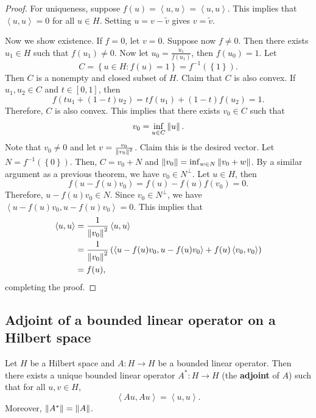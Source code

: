 \documentclass[a4paper]{article}
\renewcommand{\braket}[2]{\left\langle #1, #1 \right\rangle}
\begin{document}
\begin{proof}
  For uniqueness, suppose $f(u) = \braket{u}{v}
    = \braket{u}{\tilde{v}}$. This implies that
  $\braket{u}{v - \tilde{v}} = 0$ for all $u \in H$.
  Setting $u = v - \tilde{v}$ gives $v = \tilde{v}$.

  Now we show existence. If $f = 0$, let $v = 0$.
  Suppose now $f \neq 0$. Then there exists
  $u_1 \in H$ such that $f(u_1) \neq 0$.
  Now let $u_0 = \frac{u_1}{f(u_1)}$, then $f(u_0) = 1$.
  Let
  \[
    C = \left\{ u \in H: f(u) = 1 \right\} = f^{-1}
    (\left\{ 1 \right\}).
  \]
  Then $C$ is a nonempty and closed subset of $H$.
  Claim that $C$ is also convex. If $u_1, u_2 \in C$
  and $t \in [0, 1]$, then
  \[
    f(t u_1 + (1-t) u_2) = t f(u_1) + (1 - t) f(u_2) = 1.
  \]
  Therefore, $C$ is also convex. This implies that
  there exists $v_0 \in C$ such that
  \[
    v_0 = \inf_{u \in C} \left\lVert u\right\rVert.
  \]
  Note that $v_0 \neq 0$ and let $v = \frac{v_0}{\left\lVert v_0\right\rVert^2}$.
  Claim this is the desired vector. Let $N = f^{-1}
    (\left\{ 0 \right\})$. Then,
  $C = v_0 + N$ and $\left\lVert v_0\right\rVert = \inf_{w \in N} \left\lVert v_0 + w\right\rVert$.
  By a similar argument as a previous theorem,
  we have $v_0 \in N^\perp$. Let $u \in H$, then
  \[
    f(u - f(u) v_0) = f(u) - f(u) f(v_0) = 0.
  \]
  Therefore, $u - f(u)v_0 \in N$. Since $v_0 \in N^\perp$,
  we have $\braket{u - f(u) v_0}{v_0} = 0$. This implies that
  \[
    \begin{aligned}
      \braket{u}{v}
       & = \frac{1}{\norm{v_0}^2} \braket{u}{v_0}                  \\
       & = \frac{1}{\norm{v_0}^2} \left( \braket{u - f(u)v_0}{v_0}
      + f(u) \braket{v_0}{v_0} \right)                             \\
       & = f(u),
    \end{aligned}
  \]
  completing the proof.
\end{proof}

\subsection{Adjoint of a bounded linear operator
  on a Hilbert space}

\begin{thm}
  Let $H$ be a Hilbert space and $A : H \to H$ be a bounded
  linear operator. Then there exists a unique bounded linear
  operator $A^* : H \to H$ (the \textbf{adjoint} of $A$) such
  that for all $u, v \in H$,
  \[
    \braket{A u}{v} = \braket{u}{A^* v}.
  \]
  Moreover, $\left\lVert A^*\right\rVert = \left\lVert A\right\rVert$.
\end{thm}
\end{document}
